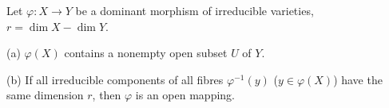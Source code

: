 Let $\varphi: X \rightarrow Y$ be a dominant morphism of irreducible varieties, $r = \dim X - \dim Y$.

(a) $\varphi(X)$ contains a nonempty open subset $U$ of $Y$.

(b) If all irreducible components of all fibres $\varphi^{-1}(y)$ ($y \in \varphi(X)$) have the same dimension $r$, then $\varphi$ is an open mapping.
